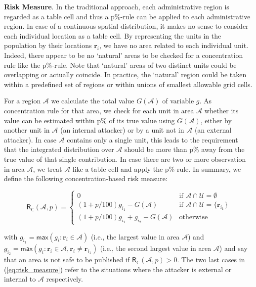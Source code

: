 \textbf{Risk Measure}. In the traditional approach, each administrative region is
regarded as a table cell and thus a p\%-rule can be applied to each administrative region. In case of a continuous spatial distribution, it makes no sense to
consider each individual location as a table cell. By representing the units in the
population by their locations $\mathbf{r}_i$, we have no area related to each individual unit.
Indeed, there appear to be no ‘natural’ areas to be checked for a concentration
rule like the p\%-rule. Note that ‘natural’ areas of two distinct units could be
overlapping or actually coincide. In practice, the ‘natural’ region could be taken
within a predefined set of regions or within unions of smallest allowable grid
cells.

For a region $\mathcal{A}$ we calculate the total value $G(\mathcal{A})$ of variable $g$. As concentration rule for that area, we check for each unit in area $\mathcal{A}$ whether its value can be
estimated within p\% of its true value using $G(\mathcal{A})$, either by another unit in $\mathcal{A}$ (an internal attacker) or by a unit not in $\mathcal{A}$ (an external attacker). In case
$\mathcal{A}$ contains only a single unit, this leads to the requirement that the integrated
distribution over $\mathcal{A}$ should be more than p\% away from the true value of that
single contribution. In case there are two or more observation in area $\mathcal{A}$, we treat
$\mathcal{A}$ like a table cell and apply the p\%-rule. 
In summary, we define
the following concentration-based risk measure:

\begin{equation}
\label{eq:risk_measure}
\mathsf{R_C}(\mathcal{A}, p) = 
   \left\{
   \begin{array}{rl}
   0 & \text{if } \mathcal{A} \cap \mathcal{U} = \emptyset \\
   (1 + p/100)g_{i_1} - G(\mathcal{A}) & \text{if } \mathcal{A} \cap \mathcal{U} = \{ \mathbf{r}_{i_1} \} \\
   (1 + p/100)g_{i_1} + g_{i_2} - G(\mathcal{A}) & \text{otherwise }
   \end{array}
   \right.
\end{equation}

with $g_{i_1} = \textsf{max}(g_i : \mathbf{r}_i \in \mathcal{A})$ 
(i.e., the largest value in area $\mathcal{A}$) and 
$g_{i_2} = \textsf{max}(g_i :\mathbf{r}_i \in \mathcal{A}, \mathbf{r}_i \neq \mathbf{r}_{i_1})$ (i.e., the second largest value in area $\mathcal{A}$) and say that an
area is not safe to be published if $\mathsf{R_C}(\mathcal{A}, p) > 0$. 
The two last cases in (\ref{eq:risk_measure}) refer to the
situations where the attacker is external or internal to $\mathcal{A}$ respectively.

